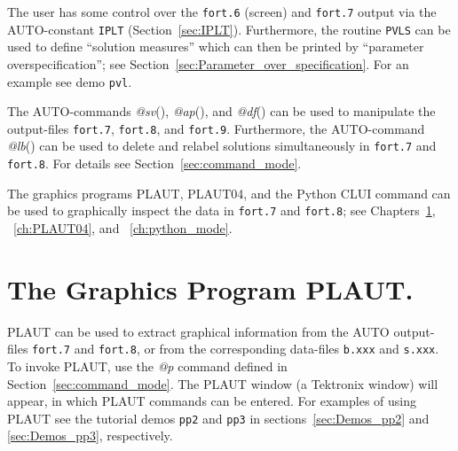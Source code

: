 \documentclass[12pt]{report}
\begin{document}
The user has some control over the {\tt fort.6} (screen) and {\tt fort.7} output 
via the {\cal AUTO}-constant {\tt IPLT} (Section~\ref{sec:IPLT}).
Furthermore, the routine {\tt PVLS} can be used to define ``solution measures''
which can then be printed by ``parameter overspecification'';
see Section~\ref{sec:Parameter_over_specification}.
For an example see demo {\tt pvl}.

The {\cal AUTO}-commands {\it @sv}(), {\it @ap}(),
 and {\it @df}() can be used 
to manipulate  the output-files {\tt fort.7}, {\tt fort.8},
and {\tt fort.9}.
Furthermore, the {\cal AUTO}-command {\it @lb}() can be
used to delete and
relabel solutions simultaneously in {\tt fort.7} and {\tt fort.8}.
For details see Section~\ref{sec:command_mode}.

The graphics programs {\cal PLAUT}, {\cal PLAUT04}, and the Python
CLUI command  can be used to graphically inspect 
the data in {\tt fort.7} and {\tt fort.8}; see Chapters~\ref{ch:PLAUT},
~\ref{ch:PLAUT04}, and ~\ref{ch:python_mode}.
 
\chapter{ The Graphics Program PLAUT.} \label{ch:PLAUT}
{\cal PLAUT} can be used to extract graphical
information from the {\cal AUTO} output-files {\tt fort.7} and {\tt fort.8},
or from the corresponding data-files {\tt b.xxx} and {\tt s.xxx}.
To invoke {\cal PLAUT}, use the {\it @p} command defined in 
Section~\ref{sec:command_mode}.
The {\cal PLAUT} window (a Tektronix window) will appear, in which {\cal PLAUT}
commands can be entered.
For examples of using {\cal PLAUT} see the tutorial demos {\tt pp2}
and {\tt pp3} in sections~\ref{sec:Demos_pp2} and \ref{sec:Demos_pp3},
respectively.
\end{document}
